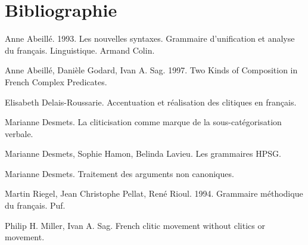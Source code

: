 \section{Bibliographie}

Anne Abeillé. 1993. Les nouvelles syntaxes. Grammaire d'unification et analyse du français. Linguistique. Armand Colin.

Anne Abeillé, Danièle Godard, Ivan A. Sag. 1997. Two Kinds of Composition in French Complex Predicates.

Elisabeth Delais-Roussarie. Accentuation et réalisation des clitiques en français.

Marianne Desmets. La cliticisation comme marque de la sous-catégorisation verbale.

Marianne Desmets, Sophie Hamon, Belinda Lavieu. Les grammaires HPSG.

Marianne Desmets. Traitement des arguments non canoniques.

Martin Riegel, Jean Christophe Pellat, René Rioul. 1994. Grammaire méthodique du français. Puf.

Philip H. Miller, Ivan A. Sag. French clitic movement without clitics or movement.
